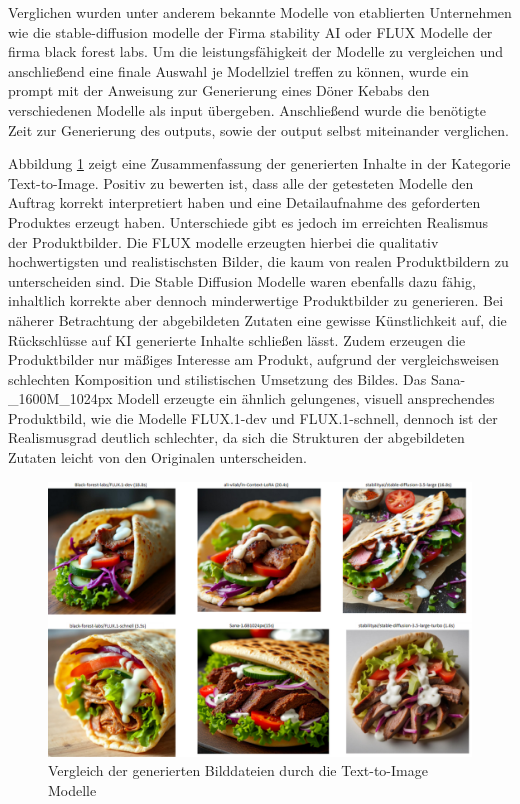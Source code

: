 Verglichen wurden unter anderem bekannte Modelle von etablierten Unternehmen wie die stable-diffusion modelle der Firma stability AI oder FLUX Modelle der firma black forest labs.
Um die leistungsfähigkeit der Modelle zu vergleichen und anschließend eine finale Auswahl je Modellziel treffen zu können, wurde ein prompt mit der Anweisung zur Generierung eines Döner Kebabs den verschiedenen Modelle als input übergeben.
Anschließend wurde die benötigte Zeit zur Generierung des outputs, sowie der output selbst miteinander verglichen.

Abbildung \ref{fig:results_image_generation} zeigt eine Zusammenfassung der generierten Inhalte in der Kategorie Text-to-Image.
Positiv zu bewerten ist, dass alle der getesteten Modelle den Auftrag korrekt interpretiert haben und eine Detailaufnahme des geforderten Produktes erzeugt haben.
Unterschiede gibt es jedoch im erreichten Realismus der Produktbilder.
Die FLUX modelle erzeugten hierbei die qualitativ hochwertigsten und realistischsten Bilder, die kaum von realen Produktbildern zu unterscheiden sind.
Die Stable Diffusion Modelle waren ebenfalls dazu fähig, inhaltlich korrekte aber dennoch minderwertige Produktbilder zu generieren.
Bei näherer Betrachtung der abgebildeten Zutaten eine gewisse Künstlichkeit auf, die Rückschlüsse auf KI generierte Inhalte schließen lässt.
Zudem erzeugen die Produktbilder nur mäßiges Interesse am Produkt, aufgrund der vergleichsweisen schlechten Komposition und stilistischen Umsetzung des Bildes.
Das Sana-\_1600M\_1024px Modell erzeugte ein ähnlich gelungenes, visuell ansprechendes Produktbild, wie die Modelle FLUX.1-dev und FLUX.1-schnell, dennoch ist der Realismusgrad deutlich schlechter, da sich die Strukturen der abgebildeten Zutaten leicht von den Originalen unterscheiden.

\begin{figure}[htbp]
    \centering
    \includegraphics[width=\textwidth]{abbildungen/Results_image_generation}
    \caption{Vergleich der generierten Bilddateien durch die Text-to-Image Modelle}
    \label{fig:results_image_generation}
\end{figure}

